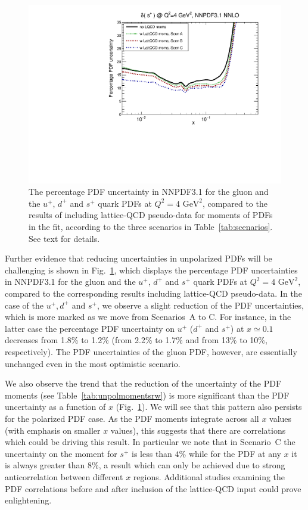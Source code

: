 \begin{figure}[!t]
\includegraphics[scale=0.45]{plots/xsp-unpol-lattice-relerr.pdf}
\caption{\small The percentage PDF uncertainty in NNPDF3.1  
  for the gluon and the $u^+$, $d^+$ and $s^+$ quark PDFs at
  $Q^2=4\text{ GeV}^2$,
  compared to the results of including lattice-QCD pseudo-data for
  moments of PDFs in the fit, according to the three
  scenarios in Table~\ref{tab:scenarios}.
  See text for details.
}    
\label{fig:impactUnpol}
\end{figure}

Further evidence that reducing uncertainties in unpolarized PDFs will be 
challenging is shown in Fig.~\ref{fig:impactUnpol}, which displays the 
percentage PDF uncertainties in NNPDF3.1 for the gluon and the
$u^+$, $d^+$ and $s^+$ quark PDFs at $Q^2=4\text{ GeV}^2$, compared to the 
corresponding results including lattice-QCD pseudo-data.
%
In the case of the $u^+,d^+$ and $s^+$, we observe a slight reduction
of the PDF uncertainties, which is more marked as we move
from Scenarios~A to C.
%
For instance, in the latter case the percentage PDF
uncertainty on $u^+$ ($d^+$ and $s^+$) at $x\simeq 0.1$
decreases from 1.8\% to 1.2\% (from 2.2\% to 1.7\% and from 13\% to 10\%, 
respectively).
%
The PDF uncertainties of the gluon PDF, however,
are essentially unchanged even in the most optimistic scenario.

We also observe the trend that the reduction of the uncertainty 
of the PDF moments (see Table~\ref{tab:unpolmomentsrw})
is more significant than the PDF uncertainty as a function of $x$  
(Fig.~\ref{fig:impactUnpol}).
%
We will see that this pattern also persists for the polarized PDF case.
%
As the PDF moments integrate across all $x$ values (with emphasis on 
smaller $x$ values), this suggests that there are correlations which could be 
driving this result.
%
In particular we note that in Scenario~C the uncertainty on the moment for 
$s^+$ is less than $4\%$ while for the PDF at any $x$ it is always greater 
than  $8\%$, a result which can only be achieved due to strong anticorrelation
between different $x$ regions. 
% 
Additional studies examining the PDF correlations before and after inclusion 
of the lattice-QCD input could prove enlightening. 

